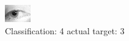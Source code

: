 \begin{figure}[h!]
\begin{center}
\includegraphics[width=0.60\columnwidth]{figures/ID1409_class_4_target_3.png}
\end{center}
\caption{ Classification: 4 actual target: 3}
\label{fig:ID1409_class_4_target_3}
\end{figure}
